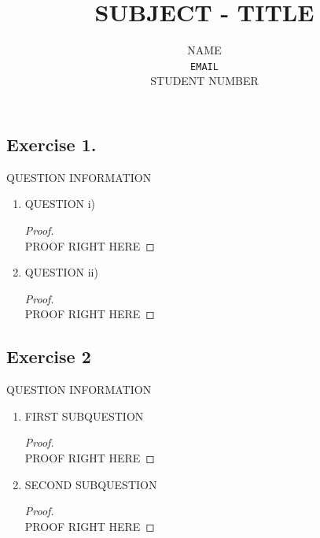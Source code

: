 \documentclass{article}
\title{
	\Huge{\bf{SUBJECT - TITLE}}
}
\author{
NAME \\
	\texttt{EMAIL} \\
	STUDENT NUMBER
}
\date{
	MONTH DAY\ts{th}, YEAR
	\vspace{1cm}
	\hrule
	\vspace{0.2cm}
}
\begin{document}
\maketitle
\subsection*{\noindent Exercise 1.}
QUESTION INFORMATION
\begin{enumerate}[ label=\bfseries(\roman*)]

    \item QUESTION i)
    \begin{proof}\hfill
    \\
	PROOF RIGHT HERE
	\end{proof}
    
    \item QUESTION ii)
    \begin{proof} \hfill
	\\
	PROOF RIGHT HERE
    \end{proof}
\end{enumerate}


\subsection*{\noindent Exercise 2}
QUESTION INFORMATION
\begin{enumerate}[ label=\bfseries(\roman*)]
    
	\item FIRST SUBQUESTION
    \begin{proof} \hfill
	\\
	PROOF RIGHT HERE
    \end{proof}
    
    \item SECOND SUBQUESTION
    \begin{proof}\hfill
	\\
	PROOF RIGHT HERE
    \end{proof}
\end{enumerate}
\end{document}
